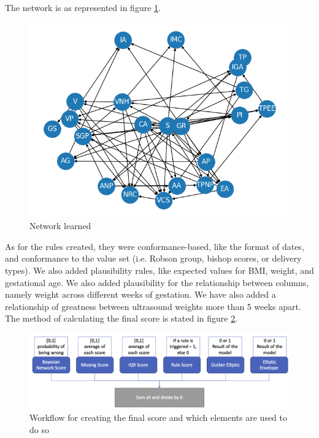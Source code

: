 The network is as represented in figure \ref{fig:network}.
\begin{figure}[htbp]
\centering
\caption{Network learned}\label{fig:network} 
\includegraphics[scale=0.68]{figures/network.png}
\end{figure}

As for the rules created, they were conformance-based, like the format of dates, and conformance to the value set (i.e. Robson group, bishop scores, or delivery types). We also added plausibility rules, like expected values for BMI, weight, and gestational age. We also added plausibility for the relationship between columns, namely weight across different weeks of gestation. We have also added a relationship of greatness between ultrasound weights more than 5 weeks apart. 
The method of calculating the final score is stated in figure \ref*{fig:wf}.


\begin{figure}[htbp]
    \centering
    \caption{Workflow for creating the final score and which elements are used to do so}\label{fig:wf} 
    \includegraphics[scale=0.38]{figures/wf-update-dq.png}
    \end{figure}


